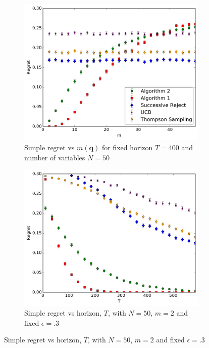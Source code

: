 \documentclass{article}
\begin{document}

 \begin{figure}[ht]
 	\begin{subfigure}[t]{0.49\textwidth}
 		\centering    
 		\includegraphics[width=\textwidth]{experiment1_20161020_1247.pdf}
 		\caption{Simple regret vs $m(\boldsymbol{q})$ for fixed horizon $T=400$ and number of variables $N = 50$}
 		\label{fig:simple_vs_m}
 	\end{subfigure}\hfill
 	\begin{subfigure}[t]{0.49\textwidth}
 		\centering
 		\includegraphics[width=\textwidth]{experiment3_20161020_1252.pdf}
 		\caption{Simple regret vs horizon, $T$, with $N = 50$, $m=2$ and fixed $\epsilon = .3$}
 		\label{fig:simple_vs_T}
 	\end{subfigure}
 \end{figure}
\end{document}
